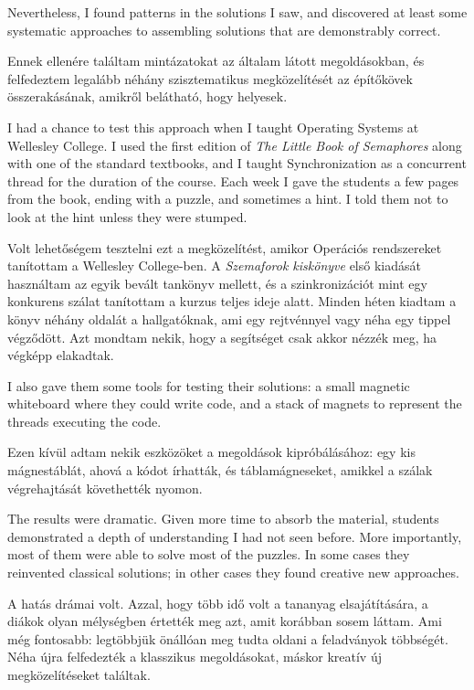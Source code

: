 \documentclass{book}
\begin{document}
Nevertheless, I found patterns in the solutions I saw, and discovered
at least some systematic approaches to assembling solutions that are
demonstrably correct.

Ennek ellenére találtam mintázatokat az általam látott megoldásokban,
és felfedeztem legalább néhány szisztematikus megközelítését az építőkövek
összerakásának, amikről belátható, hogy helyesek.

I had a chance to test this approach when I taught Operating Systems
at Wellesley College.  I used the first edition of {\em The Little
Book of Semaphores} along with one of the standard textbooks, and I
taught Synchronization as a concurrent thread for the duration of the
course.  Each week I gave the students a few pages from the book,
ending with a puzzle, and sometimes a hint.  I told them not to look
at the hint unless they were stumped.

Volt lehetőségem tesztelni ezt a megközelítést, amikor Operációs
rendszereket tanítottam a Wellesley College-ben. A {\em Szemaforok
kiskönyve} első kiadását használtam az egyik bevált tankönyv mellett,
és a szinkronizációt mint egy konkurens szálat tanítottam a kurzus
teljes ideje alatt. Minden héten kiadtam a könyv néhány oldalát a
hallgatóknak, ami egy rejtvénnyel vagy néha egy tippel végződött.
Azt mondtam nekik, hogy a segítséget csak akkor nézzék meg, ha végképp elakadtak.

I also gave them some tools for testing their solutions: a small
magnetic whiteboard where they could write code, and a stack of
magnets to represent the threads executing the code.

Ezen kívül adtam nekik eszközöket a megoldások kipróbálásához:
egy kis mágnestáblát, ahová a kódot írhatták, és táblamágneseket,
amikkel a szálak végrehajtását követhették nyomon.

The results were dramatic.  Given more time to absorb the material,
students demonstrated a depth of understanding I had not seen before.
More importantly, most of them were able to solve most of the puzzles.
In some cases they reinvented classical solutions; in other cases
they found creative new approaches.

A hatás drámai volt. Azzal, hogy több idő volt a tananyag elsajátítására,
a diákok olyan mélységben értették meg azt, amit korábban sosem láttam.
Ami még fontosabb: legtöbbjük önállóan meg tudta oldani a feladványok
többségét. Néha újra felfedezték a klasszikus megoldásokat, máskor
kreatív új megközelítéseket találtak.
\end{document}
